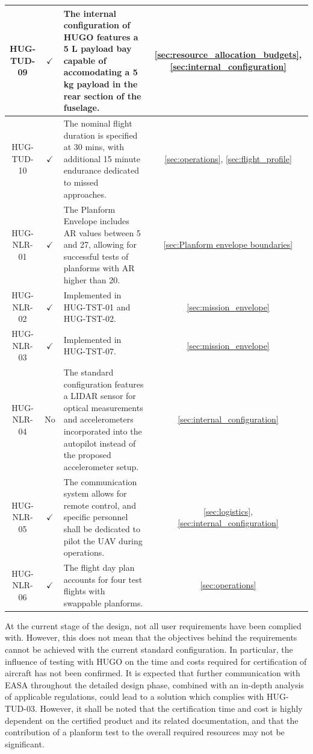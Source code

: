 \begin{longtable}{|c|c|p{10cm}|c|}
HUG-TUD-09 & $\checkmark$ & The internal configuration of HUGO features a 5 L payload bay capable of accomodating a 5 kg payload in the rear section of the fuselage. & \ref{sec:resource_allocation_budgets}, \ref{sec:internal_configuration} \\\hline
HUG-TUD-10 & $\checkmark$ & The nominal flight duration is specified at 30 mins, with additional 15 minute endurance dedicated to missed approaches. & \ref{sec:operations}, \ref{sec:flight_profile}  \\\hline
HUG-NLR-01 & $\checkmark$ & The Planform Envelope includes AR values between 5 and 27, allowing for successful tests of planforms with AR higher than 20. & \ref{sec:Planform envelope boundaries} \\\hline
HUG-NLR-02 & $\checkmark$ & Implemented in HUG-TST-01 and HUG-TST-02. & \ref{sec:mission_envelope} \\\hline
HUG-NLR-03 & $\checkmark$ & Implemented in HUG-TST-07. & \ref{sec:mission_envelope} \\\hline
HUG-NLR-04 & No & The standard configuration features a LIDAR sensor for optical measurements and accelerometers incorporated into the autopilot instead of the proposed accelerometer setup. & \ref{sec:internal_configuration} \\\hline
HUG-NLR-05 & $\checkmark$ & The communication system allows for remote control, and specific personnel shall be dedicated to pilot the UAV during operations. & \ref{sec:logistics}, \ref{sec:internal_configuration} \\\hline
HUG-NLR-06 & $\checkmark$ & The flight day plan accounts for four test flights with swappable planforms. & \ref{sec:operations} \\\hline

\end{longtable}

At the current stage of the design, not all user requirements have been complied with. However, this does not mean that the objectives behind the requirements cannot be achieved with the current standard configuration. In particular, the influence of testing with HUGO on the time and costs required for certification of aircraft has not been confirmed. It is expected that further communication with EASA throughout the detailed design phase, combined with an in-depth analysis of applicable regulations, could lead to a solution which complies with HUG-TUD-03. However, it shall be noted that the certification time and cost is highly dependent on the certified product and its related documentation, and that the contribution of a planform test to the overall required resources may not be significant.

